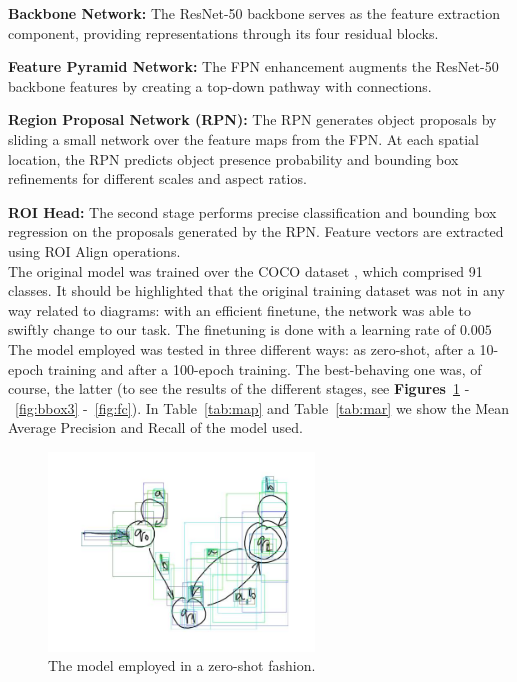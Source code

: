 \documentclass[conference]{IEEEtran}
\begin{document}
\textbf{Backbone Network:} The ResNet-50 backbone serves as the feature extraction component, providing representations through its four residual blocks.

\textbf{Feature Pyramid Network:} The FPN enhancement augments the ResNet-50 backbone features by creating a top-down pathway with connections.

\textbf{Region Proposal Network (RPN):} The RPN generates object proposals by sliding a small network over the feature maps from the FPN. At each spatial location, the RPN predicts object presence probability and bounding box refinements for different scales and aspect ratios.

\textbf{ROI Head:} The second stage performs precise classification and bounding box regression on the proposals generated by the RPN. Feature vectors are extracted using ROI Align operations. \\

The original model was trained over the COCO dataset \cite{coco}, which comprised 91 classes. It should be highlighted that the original training dataset was not in any way related to diagrams: with an efficient finetune, the network was able to swiftly change to our task. The finetuning is done with a learning rate of $0.005$ \\

The model employed was tested in three different ways: as zero-shot, after a 10-epoch training and after a 100-epoch training. The best-behaving one was, of course, the latter (to see the results of the different stages, see \textbf{Figures}~\ref{fig:bbox1} -~\ref{fig:bbox3} -~\ref{fig:fc}). In Table~\ref{tab:map} and Table~\ref{tab:mar} we show the Mean Average Precision and Recall of the model used.

\begin{figure}[H]
	\centering
	\includegraphics[width=200pt, height=150pt]{bbox1.jpg}
	\caption{The model employed in a zero-shot fashion.}
	\label{fig:bbox1}
\end{figure}
\end{document}
